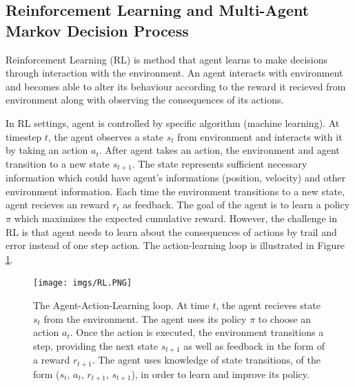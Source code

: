 \documentclass[11pt,twocolumn]{jarticle} %
\begin{document}
\subsection{Reinforcement Learning and Multi-Agent Markov Decision Process}

Reinforcement Learning (RL) is method that agent learns to make decisions through interaction with the environment. An agent interacts with environment and becomes able to alter its behaviour according to the reward it recieved from environment along with observing the consequences of its actions. \par

In RL settings, agent is controlled by specific algorithm (machine learning). At timestep $t$, the agent observes a state $s_t$ from environment and interacts with it by taking an action $a_t$. After agent takes an action, the environment and agent transition to a new state $s_{t+1}$. The state represents sufficient necessary information which could have agent's informations (position, velocity) and other environment information. Each time the environment transitions to a new state, agent recieves an reward $r_t$ as feedback. The goal of the agent is to learn a policy $\pi$ which maximizes the expected cumulative reward. However, the challenge in RL is that agent needs to learn about the consequences of actions by trail and error instead of one step action. The action-learning loop is illustrated in Figure \ref{fig:rl}. \par
\begin{figure}[h]
 \begin{center}
  \texttt{[image: imgs/RL.PNG]}
  \caption{
  The Agent-Action-Learning loop. At time $t$, the agent recieves state $s_t$ from the environment. The agent uses its policy $\pi$ to choose an action $a_t$. Once the action is executed, the environment transitions a step, providing the next state $s_{t+1}$ as well as feedback in the form of a reward $r_{t+1}$. The agent uses knowledge of state transitions, of the form ($s_t$, $a_t$, $r_{t+1}$, $s_{t+1}$), in order to learn and improve its policy.
  }
  \label{fig:rl}
 \end{center}
\end{figure}
\end{document}
